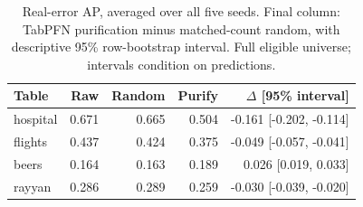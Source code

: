 \begin{table}[t]
\centering\small
\setlength{\tabcolsep}{3.5pt}
\caption{Real-error AP, averaged over all five seeds. Final column: TabPFN purification minus matched-count random, with descriptive 95\% row-bootstrap interval. Full eligible universe; intervals condition on predictions.}
\label{tab:primary}
\begin{tabular}{lrrrr}
\toprule
Table & Raw & Random & Purify & $\Delta$ [95\% interval] \\
\midrule
hospital & 0.671 & 0.665 & 0.504 & -0.161 [-0.202, -0.114] \\
flights & 0.437 & 0.424 & 0.375 & -0.049 [-0.057, -0.041] \\
beers & 0.164 & 0.163 & 0.189 & 0.026 [0.019, 0.033] \\
rayyan & 0.286 & 0.289 & 0.259 & -0.030 [-0.039, -0.020] \\
\bottomrule
\end{tabular}
\end{table}
